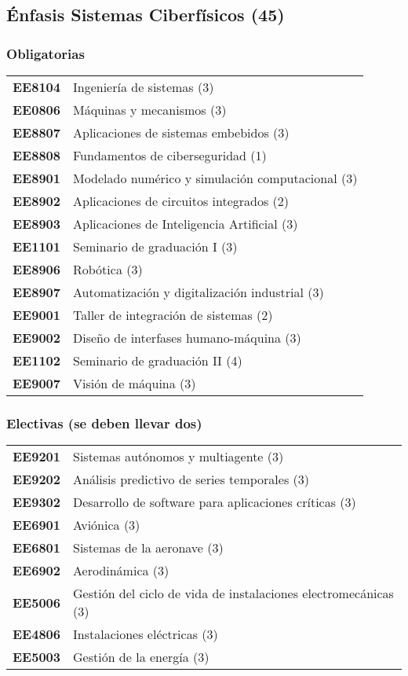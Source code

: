 \documentclass[letterpaper]{article}%
\begin{document}
%
\subsection*{Énfasis Sistemas Ciberfísicos (45)}%
\label{subsec:nfasisSistemasCiberfsicos(45)}%
\subsubsection*{Obligatorias}%
\label{ssubsec:Obligatorias}%
\vspace*{0.2cm}%
\begin{tabularx}{\textwidth}{p{1.5cm}p{10cm}}%
\textbf{EE8104}&Ingeniería de sistemas (3)\\%
\textbf{EE0806}&Máquinas y mecanismos (3)\\%
\textbf{EE8807}&Aplicaciones de sistemas embebidos (3)\\%
\textbf{EE8808}&Fundamentos de ciberseguridad (1)\\%
\textbf{EE8901}&Modelado numérico y simulación computacional (3)\\%
\textbf{EE8902}&Aplicaciones de circuitos integrados (2)\\%
\textbf{EE8903}&Aplicaciones de Inteligencia Artificial (3)\\%
\textbf{EE1101}&Seminario de graduación I (3)\\%
\textbf{EE8906}&Robótica (3)\\%
\textbf{EE8907}&Automatización y digitalización industrial (3)\\%
\textbf{EE9001}&Taller de integración de sistemas (2)\\%
\textbf{EE9002}&Diseño de interfases humano{-}máquina (3)\\%
\textbf{EE1102}&Seminario de graduación II (4)\\%
\textbf{EE9007}&Visión de máquina (3)\\%
\end{tabularx}

%
\subsubsection*{Electivas (se deben llevar dos)}%
\label{ssubsec:Electivas(sedebenllevardos)}%
\vspace*{0.2cm}%
\begin{tabularx}{\textwidth}{p{1.5cm}p{10cm}}%
\textbf{EE9201}&Sistemas autónomos y multiagente (3)\\%
\textbf{EE9202}&Análisis predictivo de series temporales (3)\\%
\textbf{EE9302}&Desarrollo de software para aplicaciones críticas (3)\\%
\textbf{EE6901}&Aviónica (3)\\%
\textbf{EE6801}&Sistemas de la aeronave (3)\\%
\textbf{EE6902}&Aerodinámica (3)\\%
\textbf{EE5006}&Gestión del ciclo de vida de instalaciones electromecánicas (3)\\%
\textbf{EE4806}&Instalaciones eléctricas (3)\\%
\textbf{EE5003}&Gestión de la energía (3)\\%
\end{tabularx}

%
\end{document}
